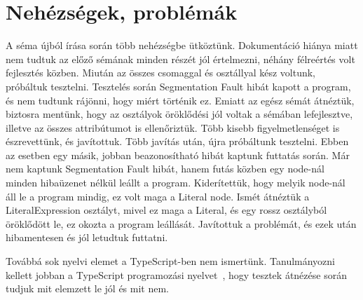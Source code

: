 \section{Nehézségek, problémák}
A séma újból írása során több nehézségbe ütköztünk.
Dokumentáció hiánya miatt nem tudtuk az előző sémának minden részét jól értelmezni, néhány félreértés volt fejlesztés közben.
Miután az összes csomaggal és osztállyal kész voltunk, próbáltuk tesztelni.
Tesztelés során Segmentation Fault hibát kapott a program, és nem tudtunk rájönni, hogy miért történik ez.
Emiatt az egész sémát átnéztük, biztosra mentünk, hogy az osztályok öröklődési jól voltak a sémában lefejlesztve, illetve az összes attribútumot is ellenőriztük.
Több kisebb figyelmetlenséget is észrevettünk, és javítottuk.
Több javítás után, újra próbáltunk tesztelni. Ebben az esetben egy másik, jobban beazonosítható hibát kaptunk futtatás során.
Már nem kaptunk Segmentation Fault hibát, hanem futás közben egy node-nál minden hibaüzenet nélkül leállt a program.
Kiderítettük, hogy melyik node-nál áll le a program mindig, ez volt maga a Literal node.
Ismét átnéztük a LiteralExpression osztályt, mivel ez maga a Literal, és egy rossz osztályból öröklődött le, ez okozta a program leállását.
Javítottuk a problémát, és ezek után hibamentesen és jól letudtuk futtatni.


Továbbá sok nyelvi elemet a TypeScript-ben nem ismertünk.
Tanulmányozni kellett jobban a TypeScript programozási nyelvet~\cite{fenton2014pro, cherny2019programming, nance2014typescript, 10.1007/978-3-662-44202-9_11}, hogy tesztek átnézése során tudjuk mit elemzett le jól és mit nem.
